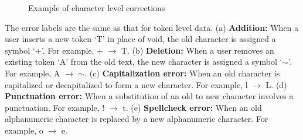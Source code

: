 \documentclass{sig-alternate}
\begin{document}
\begin{enumerate}
\begin{figure*}[ht]
\centering
{}
\label{fig:stat1}
\label{fig:stat2}
\caption{Example of character level corrections}
\end{figure*}

The error labels are the same as that for token level data.
(a) \textbf{Addition: } When a user inserts a new token `T' in place of void, the old character is assigned a symbol `+'. For example, + $\rightarrow$ T.
(b) \textbf{Deletion: } When a user removes an existing token `A' from the old text, the new character is assigned a symbol `$\sim$'. For example, A $\rightarrow$ $\sim$.
(c) \textbf{Capitalization error: } When an old character is capitalized or decapitalized to form a new character. For example, l $\rightarrow$ L.
(d) \textbf{Punctuation error: } When a substitution of an old to new character involves a punctuation. For example, ! $\rightarrow$ t.
(e) \textbf{Spellcheck error: } When an old alphanumeric character is replaced by a new alphanumeric character. For example, o $\rightarrow$ e.






\end{enumerate}
\end{document}
